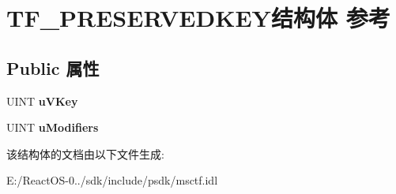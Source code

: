 \hypertarget{struct_t_f___p_r_e_s_e_r_v_e_d_k_e_y}{}\section{T\+F\+\_\+\+P\+R\+E\+S\+E\+R\+V\+E\+D\+K\+E\+Y结构体 参考}
\label{struct_t_f___p_r_e_s_e_r_v_e_d_k_e_y}
\subsection*{Public 属性}
\begin{DoxyCompactItemize}
\item 
\mbox{\label{struct_t_f___p_r_e_s_e_r_v_e_d_k_e_y_a4f9257aebf137b18ced05c9f45baf4ba}} 
U\+I\+NT {\bfseries u\+V\+Key}
\item 
\mbox{\label{struct_t_f___p_r_e_s_e_r_v_e_d_k_e_y_a7f2f2d20948edffb2dddd9723eb68404}} 
U\+I\+NT {\bfseries u\+Modifiers}
\end{DoxyCompactItemize}


该结构体的文档由以下文件生成\+:\begin{DoxyCompactItemize}
\item 
E\+:/\+React\+O\+S-\/0../sdk/include/psdk/msctf.\+idl\end{DoxyCompactItemize}
